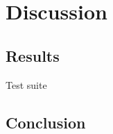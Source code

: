 \documentclass{book}
\begin{document}








\chapter{Discussion}

\section{Results}

Test suite




\section{Conclusion}




\end{document}
